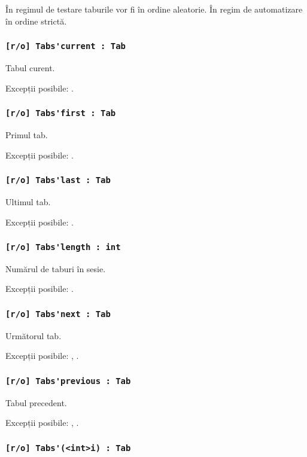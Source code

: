 În regimul de testare taburile vor fi în ordine aleatorie. În regim de automatizare în ordine strictă.

\subsubsection{\lstinline|[r/o] Tabs'current : Tab|}

Tabul curent.

Excepții posibile: .

\subsubsection{\lstinline|[r/o] Tabs'first : Tab|}

Primul tab.

Excepții posibile: .

\subsubsection{\lstinline|[r/o] Tabs'last : Tab|}

Ultimul tab.

Excepții posibile: .

\subsubsection{\lstinline|[r/o] Tabs'length : int|}

Numărul de taburi în sesie.

Excepții posibile: .

\subsubsection{\lstinline|[r/o] Tabs'next : Tab|}

Următorul tab.

Excepții posibile: , .

\subsubsection{\lstinline|[r/o] Tabs'previous : Tab|}

Tabul precedent.

Excepții posibile: , .

\subsubsection{\lstinline|[r/o] Tabs'(<int>i) : Tab|}

